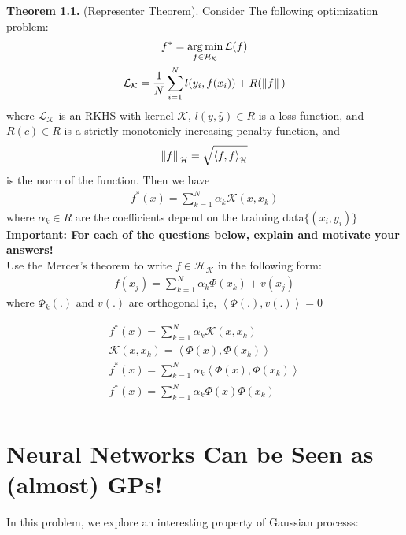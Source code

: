 \documentclass[12pt]{article}
\DeclareMathOperator*{\argmin}{arg\,min}
\begin{document}
\textbf{Theorem 1.1.} (Representer Theorem). Consider The following optimization problem:
\begin{gather*}
    f^* = \argmin_{f \in \mathcal{H}_{\mathcal{K}}} \mathcal{L} (f) \\
    \mathcal{L}_{\mathcal{K}} = \frac{1}{N} \sum_{i=1}^{N} l(y_i , f(x_i)) + R(\norm*{f})
\end{gather*}
where $\mathcal{L}_{\mathcal{K}}$ is an RKHS with kernel $\mathcal{K}$, $l(y,\hat{y})\in R$ is a loss function, and $R(c) \in R$ is a strictly monotonicly increasing penalty function, and
\begin{gather*}
    \norm*{f}_{\mathcal{H}} = \sqrt{{\left\langle  f,f \right\rangle}_{\mathcal{H}}}
\end{gather*}
is the norm of the function. Then we have
\begin{gather}
    f^*(x) = \sum_{k=1}^{N} \alpha_k \mathcal{K}(x,x_k)
\end{gather}
where $\alpha_k \in R$ are the coefficients depend on the training data$\{(x_i,y_i)\}$
\\ \textbf{Important: For each of the questions below, explain and motivate your answers!}
\\Use the Mercer’s theorem to write $f \in \mathcal{H}_{\mathcal{K}}$ in the following form:
\begin{gather*}
    f(x_j) =\sum_{k=1}^{N} \alpha_k \Phi(x_k) +v(x_j)
\end{gather*}
where $\Phi_k(.)$ and $v(.)$ are orthogonal i,e, $\left\langle  \Phi(.),v(.) \right\rangle = 0$
\begin{qsolve}
    \begin{gather*}
        f^*(x) = \sum_{k=1}^{N} \alpha_k \mathcal{K}(x,x_k) \\
        \mathcal{K}(x,x_k) = \left\langle  \Phi(x),\Phi(x_k) \right\rangle \\
        f^*(x) = \sum_{k=1}^{N} \alpha_k \left\langle  \Phi(x),\Phi(x_k) \right\rangle \\
        f^*(x) = \sum_{k=1}^{N} \alpha_k \Phi(x) \Phi(x_k) \\
    \end{gather*}
\end{qsolve}

\clearpage
\section{Neural Networks Can be Seen as (almost) GPs!}
In this problem, we explore an interesting property of Gaussian processs:
\end{document}
